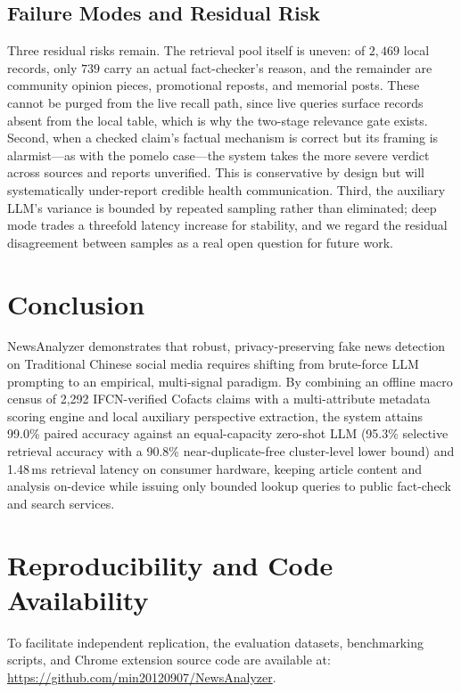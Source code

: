 \documentclass[twoside]{llncs}
\begin{document}
\subsection{Failure Modes and Residual Risk}
Three residual risks remain. The retrieval pool itself is uneven: of $2{,}469$ local records, only $739$ carry an actual fact-checker's reason, and the remainder are community opinion pieces, promotional reposts, and memorial posts. These cannot be purged from the live recall path, since live queries surface records absent from the local table, which is why the two-stage relevance gate exists. Second, when a checked claim's factual mechanism is correct but its framing is alarmist---as with the pomelo case---the system takes the more severe verdict across sources and reports unverified. This is conservative by design but will systematically under-report credible health communication. Third, the auxiliary LLM's variance is bounded by repeated sampling rather than eliminated; deep mode trades a threefold latency increase for stability, and we regard the residual disagreement between samples as a real open question for future work.

\section{Conclusion}

NewsAnalyzer demonstrates that robust, privacy-preserving fake news detection on Traditional Chinese social media requires shifting from brute-force LLM prompting to an empirical, multi-signal paradigm. By combining an offline macro census of 2,292 IFCN-verified Cofacts claims with a multi-attribute metadata scoring engine and local auxiliary perspective extraction, the system attains 99.0\% paired accuracy against an equal-capacity zero-shot LLM (95.3\% selective retrieval accuracy with a 90.8\% near-duplicate-free cluster-level lower bound) and 1.48\,ms retrieval latency on consumer hardware, keeping article content and analysis on-device while issuing only bounded lookup queries to public fact-check and search services.

\section*{Reproducibility and Code Availability}
To facilitate independent replication, the evaluation datasets, benchmarking scripts, and Chrome extension source code are available at: \url{https://github.com/min20120907/NewsAnalyzer}.
\end{document}
